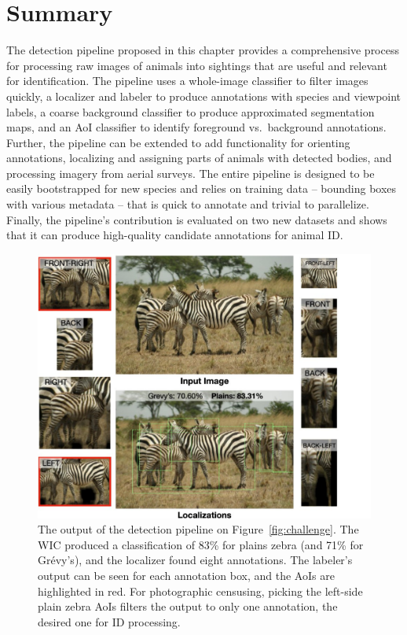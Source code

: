 \section{Summary}

The detection pipeline proposed in this chapter provides a comprehensive process for processing raw images of animals into sightings that are useful and relevant for identification.  The pipeline uses a whole-image classifier to filter images quickly, a localizer and labeler to produce annotations with species and viewpoint labels, a coarse background classifier to produce approximated segmentation maps, and an AoI classifier to identify foreground vs.\ background annotations.  Further, the pipeline can be extended to add functionality for orienting annotations, localizing and assigning parts of animals with detected bodies, and processing imagery from aerial surveys.  The entire pipeline is designed to be easily bootstrapped for new species and relies on training data -- bounding boxes with various metadata -- that is quick to annotate and trivial to parallelize. Finally, the pipeline's contribution is evaluated on two new datasets and shows that it can produce high-quality candidate annotations for animal ID.

\begin{figure}[!t]
    \begin{center}
        \includegraphics[width=1.0\linewidth]{resources/sample2-pipeline.pdf}
    \end{center}
    \caption{The output of the detection pipeline on Figure~\ref{fig:challenge}.  The WIC produced a classification of 83\% for plains zebra (and 71\% for Gr\'evy's), and the localizer found eight annotations.  The labeler's output can be seen for each annotation box, and the AoIs are highlighted in red.  For photographic censusing, picking the left-side plain zebra AoIs filters the output to only one annotation, the desired one for ID processing.}
    \label{fig:challenge-pipeline}
\end{figure}

